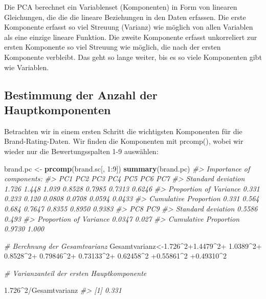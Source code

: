 \documentclass[12pt,]{book}
\newenvironment{Shaded}{\begin{snugshade}}{\end{snugshade}}
\newcommand{\KeywordTok}[1]{\textcolor[rgb]{0.13,0.29,0.53}{\textbf{{#1}}}}
\newcommand{\DecValTok}[1]{\textcolor[rgb]{0.00,0.00,0.81}{{#1}}}
\newcommand{\FloatTok}[1]{\textcolor[rgb]{0.00,0.00,0.81}{{#1}}}
\newcommand{\StringTok}[1]{\textcolor[rgb]{0.31,0.60,0.02}{{#1}}}
\newcommand{\CommentTok}[1]{\textcolor[rgb]{0.56,0.35,0.01}{\textit{{#1}}}}
\newcommand{\NormalTok}[1]{{#1}}
\begin{document}
Die PCA berechnet ein Variablenset (Komponenten) in Form von linearen
Gleichungen, die die die lineare Beziehungen in den Daten erfassen. Die
erste Komponente erfasst so viel Streuung (Varianz) wie möglich von
allen Variablen als eine einzige lineare Funktion. Die zweite Komponente
erfasst unkorreliert zur ersten Komponente so viel Streuung wie möglich,
die nach der ersten Komponente verbleibt. Das geht so lange weiter, bis
es so viele Komponenten gibt wie Variablen.

\subsection{Bestimmung der Anzahl der
Hauptkomponenten}\label{bestimmung-der-anzahl-der-hauptkomponenten}

Betrachten wir in einem ersten Schritt die wichtigsten Komponenten für
die Brand-Rating-Daten. Wir finden die Komponenten mit prcomp(), wobei
wir wieder nur die Bewertungsspalten 1-9 auswählen:

\begin{Shaded}
\begin{Highlighting}[]
\NormalTok{brand.pc <-}\StringTok{ }\KeywordTok{prcomp}\NormalTok{(brand.sc[, }\DecValTok{1}\NormalTok{:}\DecValTok{9}\NormalTok{])}
\KeywordTok{summary}\NormalTok{(brand.pc)}
\CommentTok{#> Importance of components:}
\CommentTok{#>                          PC1   PC2   PC3    PC4    PC5    PC6    PC7}
\CommentTok{#> Standard deviation     1.726 1.448 1.039 0.8528 0.7985 0.7313 0.6246}
\CommentTok{#> Proportion of Variance 0.331 0.233 0.120 0.0808 0.0708 0.0594 0.0433}
\CommentTok{#> Cumulative Proportion  0.331 0.564 0.684 0.7647 0.8355 0.8950 0.9383}
\CommentTok{#>                           PC8   PC9}
\CommentTok{#> Standard deviation     0.5586 0.493}
\CommentTok{#> Proportion of Variance 0.0347 0.027}
\CommentTok{#> Cumulative Proportion  0.9730 1.000}
\end{Highlighting}
\end{Shaded}

\begin{Shaded}
\begin{Highlighting}[]
\CommentTok{# Berchnung der Gesamtvarianz}
\NormalTok{Gesamtvarianz<-}\FloatTok{1.726}\NormalTok{^}\DecValTok{2}\FloatTok{+1.4479}\NormalTok{^}\DecValTok{2}\NormalTok{+}\StringTok{ }\FloatTok{1.0389}\NormalTok{^}\DecValTok{2}\NormalTok{+}\StringTok{ }\FloatTok{0.8528}\NormalTok{^}\DecValTok{2}\NormalTok{+}\StringTok{ }\FloatTok{0.79846}\NormalTok{^}\DecValTok{2}\NormalTok{+}\StringTok{ }
\StringTok{  }\FloatTok{0.73133}\NormalTok{^}\DecValTok{2}\NormalTok{+}\StringTok{ }\FloatTok{0.62458}\NormalTok{^}\DecValTok{2} \NormalTok{+}\FloatTok{0.55861}\NormalTok{^}\DecValTok{2} \NormalTok{+}\FloatTok{0.49310}\NormalTok{^}\DecValTok{2}

\CommentTok{# Varianzanteil der ersten Hauptkomponente}

\FloatTok{1.726}\NormalTok{^}\DecValTok{2}\NormalTok{/Gesamtvarianz}
\CommentTok{#> [1] 0.331}
\end{Highlighting}
\end{Shaded}
\end{document}
